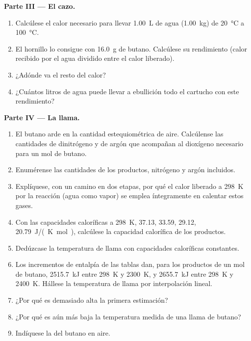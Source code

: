 \begin{problem}
\medskip
\noindent\textbf{Parte III --- El cazo.}
\begin{enumerate}[resume]
  \item Calcúlese el calor necesario para llevar \qty{1.00}{L} de agua
        (\qty{1.00}{kg}) de \qty{20}{\celsius} a \qty{100}{\celsius}.
  \item El hornillo lo consigue con \qty{16.0}{g} de butano. Calcúlese su
        rendimiento (calor recibido por el agua dividido entre el calor liberado).
  \item ¿Adónde va el resto del calor?
  \item ¿Cuántos litros de agua puede llevar a ebullición todo el cartucho
        con este rendimiento?
\end{enumerate}

\medskip
\noindent\textbf{Parte IV --- La llama.}
\begin{enumerate}[resume]
  \item El butano arde en la cantidad estequiométrica de aire. Calcúlense las
        cantidades de dinitrógeno y de argón que acompañan al dioxígeno necesario
        para un mol de butano.
  \item Enumérense las cantidades de los productos, nitrógeno y argón incluidos.
  \item Explíquese, con un camino en dos etapas, por qué el calor liberado a
        \qty{298}{K} por la reacción (agua como vapor) se emplea íntegramente en
        calentar estos gases.
  \item Con las capacidades caloríficas a \qty{298}{K},  37.13,
         33.59,  29.12,  \qty{20.79}{J/(K.mol)},
        calcúlese la capacidad calorífica de los productos.
  \item Dedúzcase la temperatura de llama con capacidades caloríficas constantes.
  \item Los incrementos de entalpía de las tablas dan, para los productos de un
        mol de butano, \qty{2515.7}{kJ} entre \qty{298}{K} y
        \qty{2300}{K}, y \qty{2655.7}{kJ} entre \qty{298}{K} y
        \qty{2400}{K}. Hállese la temperatura de llama por interpolación lineal.
  \item ¿Por qué es demasiado alta la primera estimación?
  \item ¿Por qué es aún más baja la temperatura medida de una llama de butano?
  \item Indíquese la  del butano en aire.
\end{enumerate}
\end{problem}
